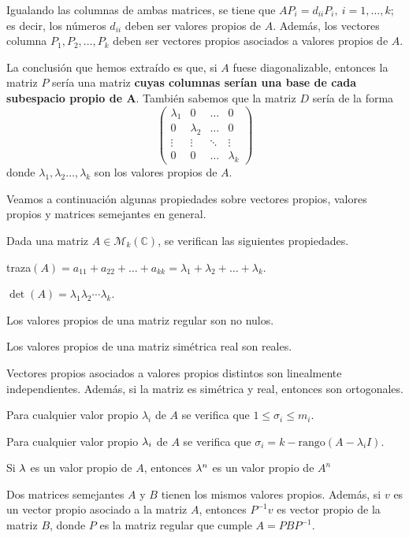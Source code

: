 Igualando las columnas de ambas matrices, se tiene que $AP_i = d_{ii}P_i, \ i =1,\dots,k$; es decir, los números $d_{ii}$ deben ser valores propios de $A$. Además, los vectores columna $P_1,P_2,\dots,P_k$ deben ser vectores propios asociados a valores propios de $A$.

La conclusión que hemos extraído es que, si $A$ fuese diagonalizable, entonces la matriz $P$ sería una matriz \textbf{cuyas columnas serían una base de cada subespacio propio de $\bm{A}$}. También sabemos que la matriz $D$ sería de la forma $$\begin{pmatrix}
  \lambda_1 & 0 & \hdots & 0 \\
  0 & \lambda_2 & \hdots & 0 \\
  \vdots & \vdots & \ddots & \vdots \\
  0 & 0 & \hdots & \lambda_k
\end{pmatrix}$$ donde $\lambda_1,\lambda_2\dots,\lambda_k$ son los valores propios de $A$.

Veamos a continuación algunas propiedades sobre vectores propios, valores propios y matrices semejantes en general.

\begin{nprop} \label{prop_matrices}
  Dada una matriz $A \in \mathcal M_k(\mathbb C)$, se verifican las siguientes propiedades.
  \begin{nlist}
  \item traza$(A) = a_{11} + a_{22} + \dots + a_{kk} = \lambda_1 + \lambda_2 +
    \dots + \lambda_k$.
  \item $\det(A) = \lambda_1\lambda_2\cdots \lambda_k$.
  \item Los valores propios de una matriz regular son no nulos.
  \item Los valores propios de una matriz simétrica real son reales.
  \item Vectores propios asociados a valores propios distintos son
    linealmente independientes. Además, si la matriz es simétrica y real, entonces son
    ortogonales.
  \item Para cualquier valor propio $\lambda_i$ de $A$ se verifica que $1 \leq \sigma_i
    \leq m_i$.
    \item Para cualquier valor propio $\lambda_i$ de $A$ se verifica que $\sigma_i = k - \text{rango}(A - \lambda_i I)$.
    \item Si $\lambda$ es un valor propio de $A$, entonces $\lambda^n$ es un valor propio de $A^n$
  \item Dos matrices semejantes $A$ y $B$ tienen los mismos valores
    propios. Además, si $v$ es un vector propio asociado a la matriz $A$,
    entonces $P^{-1}v$ es vector propio de la matriz $B$, donde $P$ es la matriz
    regular que cumple $A = PBP^{-1}$.
  \end{nlist}
\end{nprop}

